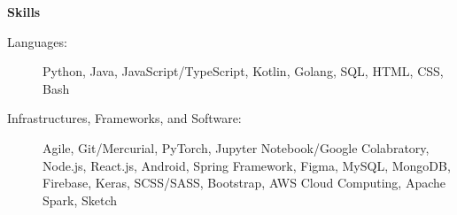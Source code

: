 \documentclass[letterpaper,10pt]{article}
\makeatletter
\newcommand{\resitem}[1]{\item #1 \vspace{-3.5pt}}  %
\newcommand{\resheading}[1]{{\large \colorbox{mygrey}{\begin{minipage}{0.989\textwidth}{\textbf{#1 \vphantom{p\^{E}}}}\end{minipage}}}}
\newcommand{\ressubheading}[4]{
\begin{tabular*}{7.0in}{l@{\extracolsep{\fill}}r}  
		\textbf{#1} & #2 \\
		\textit{#3} & \textit{#4} \\
\end{tabular*}\vspace{-6pt}}  %
\makeatother
\begin{document}
\begin{itemize}
\end{itemize}



\resheading{Skills}

\begin{description}
\item[Languages:] Python, Java, JavaScript/TypeScript, Kotlin, Golang, SQL, HTML, CSS, Bash
\item[Infrastructures, Frameworks, and Software:] Agile, Git/Mercurial, PyTorch, Jupyter Notebook/Google Colabratory, Node.js, React.js, Android, Spring Framework, Figma, MySQL, MongoDB, Firebase, Keras, SCSS/SASS, Bootstrap, AWS Cloud Computing, Apache Spark, Sketch
\end{description}
\end{document}
